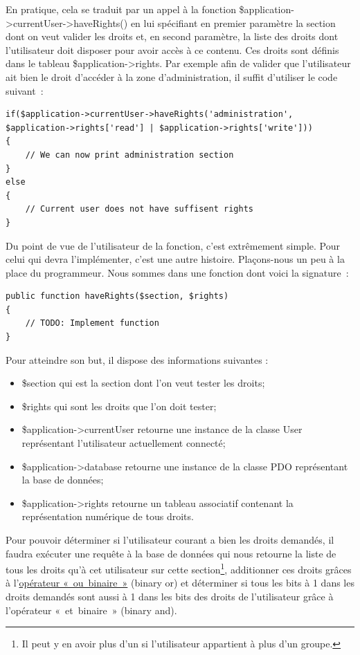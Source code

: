 \documentclass[letter, 11pt]{report}
\begin{document}
En pratique, cela se traduit par un appel à la fonction \$application->currentUser->haveRights() en lui spécifiant en premier paramètre la section dont on veut valider les droits et, en second paramètre, la liste des droits dont l'utilisateur doit disposer pour avoir accès à ce contenu. Ces droits sont définis dans le tableau \$application->rights. Par exemple afin de valider que l'utilisateur ait bien le droit d'accéder à la zone d'administration, il suffit d'utiliser le code suivant~:

\begin{lstlisting}[style=php]
if($application->currentUser->haveRights('administration', $application->rights['read'] | $application->rights['write']))
{
	// We can now print administration section
}
else
{
	// Current user does not have suffisent rights
}
\end{lstlisting}

Du point de vue de l'utilisateur de la fonction, c'est extrêmement simple. Pour celui qui devra l'implémenter, c'est une autre histoire. Plaçons-nous un peu à la place du programmeur. Nous sommes dans une fonction dont voici la signature~:

\begin{lstlisting}[style=php]
public function haveRights($section, $rights)
{
	// TODO: Implement function
}
\end{lstlisting}

Pour atteindre son but, il dispose des informations suivantes :

\begin{itemize}
	\item \$section qui est la section dont l'on veut tester les droits;
	\item \$rights qui sont les droits que l'on doit tester;
	\item \$application->currentUser retourne une instance de la classe User représentant l'utilisateur actuellement connecté;
	\item \$application->database retourne une instance de la classe PDO représentant la base de données;
	\item \$application->rights retourne un tableau associatif contenant la représentation numérique de tous droits.
\end{itemize}

Pour pouvoir déterminer si l'utilisateur courant a bien les droits demandés, il faudra exécuter une requête à la base de données qui nous retourne la liste de tous les droits qu'à cet utilisateur sur cette section\footnote{Il peut y en avoir plus d'un si l'utilisateur appartient à plus d'un groupe.}, additionner ces droits grâces à l'\href{http://www.php.net/manual/en/language.operators.bitwise.php}{opérateur «~ou~binaire~»} (binary or) et déterminer si tous les bits à 1 dans les droits demandés sont aussi à 1 dans les bits des droits de l'utilisateur grâce à l'opérateur «~et~binaire~» (binary and).
\end{document}
